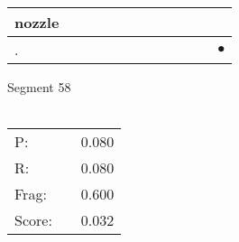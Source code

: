 \documentclass[landscape]{article}
\newcommand{\ssp}{\hspace{2pt}}
\newcommand{\mex}{\cellcolor{g}$\bullet$}
\begin{document}
\begin{tabular}{|l|p{10pt}|p{10pt}|p{10pt}|p{10pt}|p{10pt}|p{10pt}|p{10pt}|p{10pt}|p{10pt}|p{10pt}|p{10pt}|}
\hline
\ssp nozzle \ssp&\hspace{2pt}&\hspace{2pt}&\hspace{2pt}&\hspace{2pt}&\hspace{2pt}&\hspace{2pt}&\hspace{2pt}&\hspace{2pt}&\hspace{2pt}&\hspace{2pt}&\hspace{2pt}\\
\hline
\ssp \cellcolor{ref10}. \ssp&\hspace{2pt}&\hspace{2pt}&\hspace{2pt}&\hspace{2pt}&\hspace{2pt}&\hspace{2pt}&\hspace{2pt}&\hspace{2pt}&\hspace{2pt}&\hspace{2pt}&\hspace{2pt}\mex\\
\hline
\end{tabular}

\vspace{6pt}
\noindent Segment 58\\\\
\noindent\begin{tabular}{lm{12pt}r}
\hline
P:&&0.080\\
R:&&0.080\\
Frag:&&0.600\\
Score:&&0.032\\
\end{tabular}

\newpage
\end{document}
